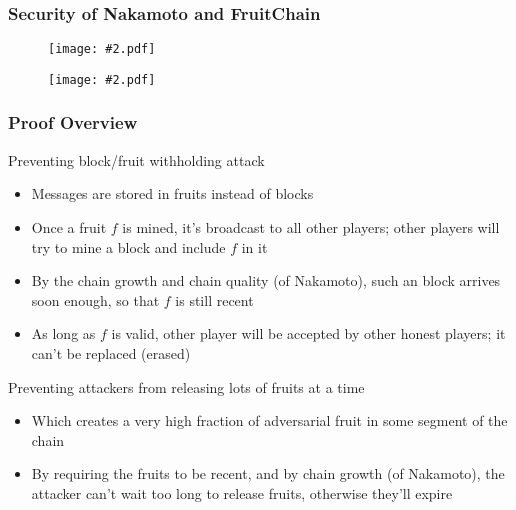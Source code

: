 \documentclass{beamer}
\newcommand{\insfig}[2][1]{
	\begin{figure}
		\texttt{[image: \#2.pdf]}
	\end{figure}
}
\begin{document}
\begin{spacing}{1.2}
\begin{frame}
	\frametitle{Security of Nakamoto and FruitChain}
	\insfig[0.95]{SoB1}
	\vspace{-11pt}
	\insfig[0.95]{SoB2}
\end{frame}

\begin{frame}
	\frametitle{Proof Overview}
	\begin{block}{Preventing block/fruit withholding attack}
		\begin{itemize}
		\item Messages are stored in fruits instead of blocks
		\item Once a fruit $f$ is mined, it's broadcast to all other players; other players will try to mine a block and include $f$ in it
		\item By the chain growth and chain quality (of Nakamoto), such an block arrives soon enough, so that $f$ is still recent
		\item As long as $f$ is valid, other player will be accepted by other honest players; it can't be replaced (erased)
		\end{itemize}
	\end{block}
	\begin{block}{Preventing attackers from releasing lots of fruits at a time}
		\begin{itemize}
			\item Which creates a very high fraction of adversarial fruit in some segment of the chain
			\item By requiring the fruits to be recent, and by chain growth (of Nakamoto), the attacker can't wait too long to release fruits, otherwise they'll expire
		\end{itemize} 
	\end{block}
\end{frame}


\end{spacing}
\end{document}
